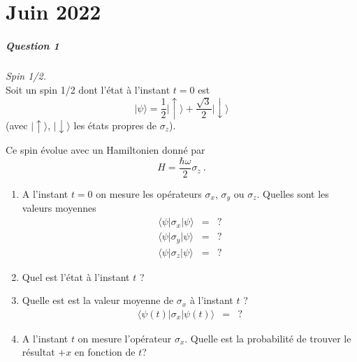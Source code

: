 \chapter{Juin 2022}

\paragraph{Question 1} \textit{Spin 1/2.} \\

Soit un spin  1/2 dont l'état à l'instant $t=0$ est
\begin{equation}
\vert \psi \rangle =  \frac{1}{2} \lvert \uparrow \rangle + 
 \frac{\sqrt{3} }{2} \lvert \downarrow \rangle
\end{equation}
(avec $\lvert \uparrow \rangle$, 
$\lvert \downarrow \rangle$ les états propres de $\sigma_z$).

Ce spin évolue avec un Hamiltonien donné par 
\begin{equation}
H = \frac{\hbar \omega }{2}\sigma_z\ .
\end{equation}

\begin{enumerate}
\item 
A l'instant $t=0$ on mesure les opérateurs $\sigma_x$, $\sigma_y$ ou $\sigma_z$.
Quelles sont les valeurs moyennes
\begin{eqnarray}
\langle \psi \rvert \sigma_x \lvert \psi \rangle &=& ?\nonumber\\
\langle \psi \rvert \sigma_y \lvert \psi \rangle &=& ?\nonumber\\
\langle \psi \rvert \sigma_z \lvert \psi \rangle &=& ?\nonumber
\end{eqnarray}

\item

Quel est l'état à l'instant $t$ ?

\item

Quelle est est la valeur moyenne de $\sigma_x$  à l'instant $t$ ?
\begin{eqnarray}
\langle \psi (t)\rvert \sigma_x \lvert \psi (t)\rangle &=& ?\nonumber
\end{eqnarray}

\item 
A l'instant $t$ on mesure l'opérateur $\sigma_x$. Quelle est la probabilité de trouver le résultat $+x$ en fonction de $t$?

\end{enumerate}

